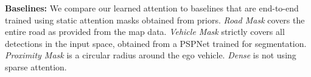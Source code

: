 \textbf{Baselines:}
We compare our learned attention to baselines that are end-to-end trained using static attention masks obtained from priors. 
\textit{Road Mask} covers the entire road as provided from the map data. \textit{Vehicle Mask} strictly covers all detections in the input space, obtained from a PSPNet \cite{pspnet} trained for segmentation. \textit{Proximity Mask} is a circular radius around the ego vehicle. \textit{Dense} is
not using sparse attention.


